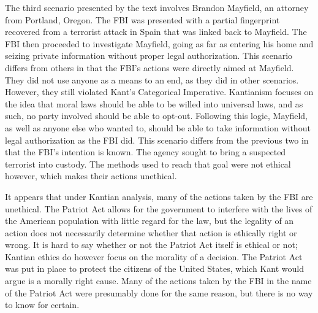 \documentclass{paper}
\begin{document}
\begin{linenumbers}
The third scenario presented by the text involves Brandon Mayfield, an attorney from Portland,
Oregon. The FBI was presented with a partial fingerprint recovered from a terrorist attack in Spain
that was linked back to Mayfield. The FBI then proceeded to investigate Mayfield, going as far as
entering his home and seizing private information without proper legal authorization. This scenario
differs from others in that the FBI's actions were directly aimed at Mayfield. They did not use
anyone as a means to an end, as they did in other scenarios. However, they still violated Kant's
Categorical Imperative. Kantianism focuses on the idea that moral laws should be able to be willed
into universal laws, and as such, no party involved should be able to opt-out. Following this logic,
Mayfield, as well as anyone else who wanted to, should be able to take information without legal
authorization as the FBI did. This scenario differs from the previous two in that the FBI's
intention is known. The agency sought to bring a suspected terrorist into custody. The methods used
to reach that goal were not ethical however, which makes their actions unethical.

It appears that under Kantian analysis, many of the actions taken by the FBI are unethical. The
Patriot Act allows for the government to interfere with the lives of the American population with
little regard for the law, but the legality of an action does not necessarily determine whether that
action is ethically right or wrong. It is hard to say whether or not the Patriot Act itself is
ethical or not; Kantian ethics do however focus on the morality of a decision. The Patriot Act was
put in place to protect the citizens of the United States, which Kant would argue is a morally right
cause. Many of the actions taken by the FBI in the name of the Patriot Act were presumably done for
the same reason, but there is no way to know for certain. \end{linenumbers} \newpage \nocite{*}
\printbibliography 
\end{document}

